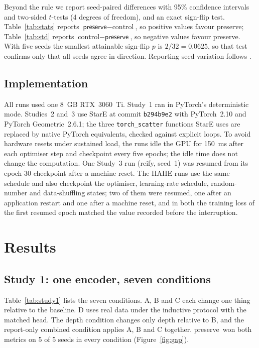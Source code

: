 \documentclass[11pt,a4paper]{article}
\newcommand{\hyper}{\textsf{preserve}}
\newcommand{\reif}{\textsf{reify}}
\begin{document}
Beyond the rule we report seed-paired differences with 95\% confidence intervals and two-sided $t$-tests (4 degrees of freedom), and an exact sign-flip test. Table~\ref{tab:stats} reports $\hyper - \text{control}$, so positive values favour \hyper; Table~\ref{tab:std} reports $\text{control} - \hyper$, so negative values favour \hyper. With five seeds the smallest attainable sign-flip $p$ is $2/32 = 0.0625$, so that test confirms only that all seeds agree in direction. Reporting seed variation follows \citet{bouthillier2021variance}.

\subsection{Implementation}

All runs used one 8~GB RTX~3060~Ti. Study~1 ran in PyTorch's deterministic mode. Studies~2 and~3 use StarE at commit \texttt{b294b9e2} with PyTorch~2.10 and PyTorch Geometric~2.6.1; the three \texttt{torch\_scatter} functions StarE uses are replaced by native PyTorch equivalents, checked against explicit loops. To avoid hardware resets under sustained load, the runs idle the GPU for 150~ms after each optimiser step and checkpoint every five epochs; the idle time does not change the computation. One Study~3 run (\reif, seed~1) was resumed from its epoch-30 checkpoint after a machine reset. The HAHE runs use the same schedule and also checkpoint the optimiser, learning-rate schedule, random-number and data-shuffling states; two of them were resumed, one after an application restart and one after a machine reset, and in both the training loss of the first resumed epoch matched the value recorded before the interruption.

\section{Results}

\subsection{Study 1: one encoder, seven conditions}
\label{sec:study1}

Table~\ref{tab:study1} lists the seven conditions. A, B and C each change one thing relative to the baseline. D uses real data under the inductive protocol with the matched head. The depth condition changes only depth relative to B, and the report-only combined condition applies A, B and C together. \hyper\ won both metrics on 5 of 5 seeds in every condition (Figure~\ref{fig:gap}).
\end{document}
